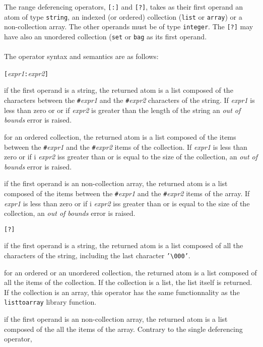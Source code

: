 The range deferencing operators, \texttt{[:]} and \texttt{[?]},
takes as their first operand an atom of type
\texttt{string}, an indexed 
(or ordered) collection (\texttt{list} or \texttt{array})
or a non-collection array. The other operands must be of type \texttt{integer}.
The \texttt{[?]} may have also an unordered collection (\texttt{set}
or \texttt{bag} as its first operand.\\
\\
The operator syntax and semantics are as follows:
\bi
\item \ex\texttt{[}\emph{expr1}\texttt{:}\emph{expr2}\texttt{]}
\be
\item if the first operand is a string,
the returned atom is a list composed of the characters between
the \texttt{\#}\emph{expr1} and the \texttt{\#}\emph{expr2} characters
of the string.
If \emph{expr1} is less than zero or or if \emph{expr2} is greater than the
length of the string an \emph{out of bounds} error is raised.
\item for an ordered collection, the returned atom is a list composed
of the items between the \texttt{\#}\emph{expr1} and the
\texttt{\#}\emph{expr2} items
of the collection. If \emph{expr1} is less than zero or if
i \emph{expr2} iss greater than or is equal to the size of the collection, an
\emph{out of bounds} error is raised.
\item if the first operand is an non-collection array, the returned atom
is a list composed of the items between the \texttt{\#}\emph{expr1} and the
\texttt{\#}\emph{expr2} items of the array.
If \emph{expr1} is less than zero or if
i \emph{expr2} iss greater than or is equal to the size of the collection, an
\emph{out of bounds} error is raised.
\ee
\item \ex\texttt{[?]}
\be
\item if the first operand is a string,
the returned atom is a list composed of all the characters of the
string, including the last character \texttt{'{\textbackslash}000'}.
\item for an ordered or an unordered collection, the returned atom is a list composed
of all the items of the collection. If the collection is a list, the
list itself is returned. If the collection is an array, this operator
has the same functionnality as the \texttt{listtoarray} library function.
\item if the first operand is an non-collection array, the returned atom
is a list composed of the all the items of the array.
\ee
\ei
Contrary to the single deferencing operator,

